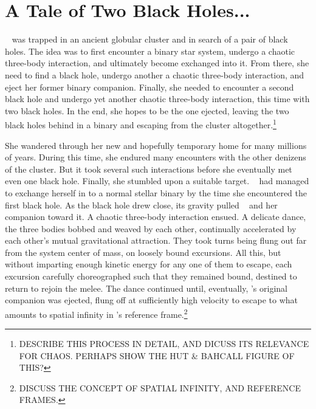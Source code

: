 \documentclass[main.tex]{subfiles}
\begin{document}
\chapter{A Tale of Two Black Holes...}

\par \nar \rmsterope~ was trapped in an ancient globular cluster and in search of a pair of black holes.  The idea was to first encounter a binary star system, undergo a chaotic three-body interaction, and ultimately become exchanged into it.  From there, she need to find a black hole, undergo another a chaotic three-body interaction, and eject her former binary companion.  Finally, she needed to encounter a second black hole and undergo yet another chaotic three-body interaction, this time with two black holes.  In the end, she hopes to be the one ejected, leaving the two black holes behind in a binary and escaping from the cluster altogether.\footnote{DESCRIBE THIS PROCESS IN DETAIL, AND DICUSS ITS RELEVANCE FOR CHAOS.  PERHAPS SHOW THE HUT \& BAHCALL FIGURE OF THIS?}  


\par \nar She wandered through her new and hopefully temporary home for many millions of years.  During this time, she endured many encounters with the other denizens of the cluster.  But it took several such interactions before she eventually met even one black hole.  Finally, she stumbled upon a suitable target.  \rmsterope~ had managed to exchange herself in to a normal stellar binary by the time she encountered the first black hole.  As the black hole drew close, its gravity pulled \rmsterope~ and her companion toward it.  A chaotic three-body interaction ensued.  A delicate dance, the three bodies bobbed and weaved by each other, continually accelerated by each other's mutual gravitational attraction.  They took turns being flung out far from the system center of mass, on loosely bound excursions.  All this, but without imparting enough kinetic energy for any one of them to escape, each excursion carefully choreographed such that they remained bound, destined to return to rejoin the melee.  The dance continued until, eventually, \rmsterope's original companion was ejected, flung off at sufficiently high velocity to escape to what amounts to spatial infinity in \rmsterope's reference frame.\footnote{DISCUSS THE CONCEPT OF SPATIAL INFINITY, AND REFERENCE FRAMES.}
\end{document}
